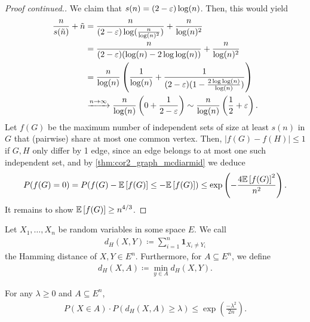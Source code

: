 \begin{proof}[Proof continued.]
    We claim that $s(n)=(2-\varepsilon) \log(n)$.
    Then, this would yield
    \begin{align*}
        \frac{n}{s(\tilde n)}+\tilde n & = \frac{n}{(2-\varepsilon) \log(\frac{n}{\log(n)^2})} + \frac{n}{\log(n)^2}                                                                           \\
                                       & = \frac{n}{(2-\varepsilon)(\log(n) - 2\log \log (n))} + \frac{n}{\log(n)^2}                                                                           \\
                                       & = \frac{n}{\log (n)} \left(\frac{1}{\log(n)} + \frac{1}{(2-\varepsilon)(1-\frac{2 \log \log (n)}{\log(n)})}\right)                                    \\
                                       & \xrightarrow{n \rightarrow \infty} \frac{n}{\log (n)}\left(0 + \frac{1}{2-\varepsilon}\right) \sim \frac{n}{\log (n)}\left(\frac{1}{2} + \varepsilon\right).
    \end{align*}
    Let $f(G)$ be the maximum number of independent sets of size at least $s(n)$ in $G$ that (pairwise) share at most one common vertex.
    Then, $|f(G) - f(H)| \leq 1$ if $G,H$ only differ by 1 edge, since an edge belongs to at most one such independent set,
    and by \autoref{thm:cor2_graph_mcdiarmid} we deduce
    \begin{align*}
        P(f(G) = 0) = P(f(G) - \mathbb{E}\left[f(G)\right] \leq - \mathbb{E}\left[f(G)\right]) \leq \exp\left(-\frac{4 \mathbb{E}\left[f(G)\right]^2}{n^2}\right).
    \end{align*}
    It remains to show $\mathbb{E}\left[f(G)\right] \geq n^{4/3}$.
\end{proof}
\begin{definition}
    Let $X_1, \dots, X_n$ be random variables in some space $E$.
    We call
    \begin{align*}
        d_H(X,Y) \coloneqq \sum_{i=1}^n \mathbf{1}_{X_i \neq Y_i}
    \end{align*}
    the Hamming distance of $X,Y \in E^n$.
    Furthermore, for $A \subseteq E^n$, we define
    \begin{align*}
        d_H(X,A) \coloneqq \min_{y \in A} d_H(X,Y).
    \end{align*}
\end{definition}
\begin{theorem}
    For any $\lambda \geq 0$ and $A \subseteq E^n$,
    \begin{align*}
        P(X \in A) \cdot P(d_H(X,A) \geq \lambda) \leq \exp\left(\frac{-\lambda^2}{2n}\right).
    \end{align*}
\end{theorem}

